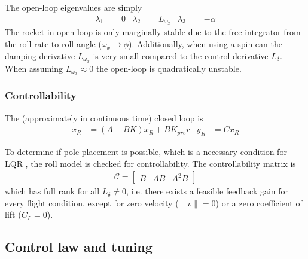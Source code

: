 The open-loop eigenvalues are simply
\begin{align}
    \lambda_1 &= 0 & \lambda_2 &= L_{\omega_x} & \lambda_3 &= -\alpha 
\end{align}
The rocket in open-loop is only marginally stable due to the free integrator from the roll rate to roll angle ($\omega_x \to \phi$).
Additionally, when using a spin can the damping derivative $L_{\omega_x}$ is very small compared to the control derivative $L_\delta$. 
When assuming $L_{\omega_x} \approx 0$ the open-loop is quadratically unstable.


\subsubsection{Controllability}
The (approximately in continuous time) closed loop is 
\begin{align}
    \dot x_R &= (A+BK) x_R + B K_{pre} r & y_R &= C x_R
    \label{eq:controller-closedloop}
\end{align}

To determine if pole placement is possible, which is a necessary condition for LQR \cite{werner2021}, the roll model is checked for controllability.
The controllability matrix is 
\begin{align}
    \mathcal{C} = \begin{bmatrix}
        B & AB & A^2 B 
    \end{bmatrix}
\end{align}
which has full rank for all $L_\delta \neq 0$, i.e. there exists a feasible feedback gain for every flight condition, except for zero velocity ($\lVert v \rVert = 0$) or a zero coefficient of lift ($C_L = 0$).

\subsection{Control law and tuning}

